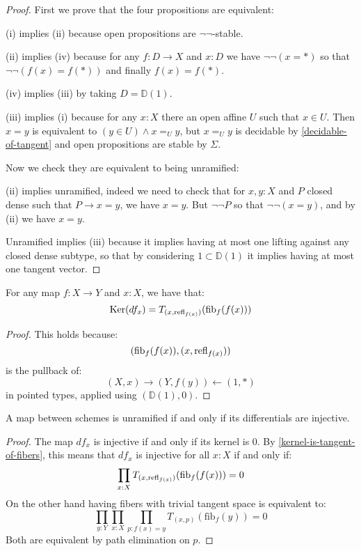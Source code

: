 \begin{proof}
First we prove that the four propositions are equivalent:

(i) implies (ii) because open propositions are $\neg\neg$-stable.

(ii) implies (iv) because for any $f:D\to X$ and $x:D$ we have $\neg\neg(x=*)$ so that $\neg\neg(f(x)=f(*))$ and finally $f(x)=f(*)$.

(iv) implies (iii) by taking $D=\mathbb{D}(1)$.

(iii) implies (i) because for any $x:X$ there an open affine $U$ such that $x\in U$. Then $x=y$ is equivalent to $(y\in U)\land x=_U y$, but $x=_Uy$ is decidable by \cref{decidable-of-tangent} and open propositions are stable by $\Sigma$.

Now we check they are equivalent to being unramified:

(ii) implies unramified, indeed we need to check that for $x,y:X$ and $P$ closed dense such that $P\to x=y$, we have $x=y$. But $\neg\neg P$ so that $\neg\neg(x=y)$, and by (ii) we have $x=y$.

Unramified implies (iii) because it implies having at most one lifting against any closed dense subtype, so that by considering $1\subset \mathbb{D}(1)$ it implies having at most one tangent vector.
\end{proof}

\begin{lemma}
\label{kernel-is-tangent-of-fibers}
For any map $f:X\to Y$ and $x:X$, we have that:
\[
\mathrm{Ker}(df_x) = T_{(x,\mathrm{refl}_{f(x)})}(\mathrm{fib}_f(f(x)))
\]
\end{lemma}
\begin{proof}
This holds because:
\[
(\mathrm{fib}_f(f(x)),(x,\mathrm{refl}_{f(x)}))
\]
is the pullback of:
\[
(X,x) \to (Y,f(y)) \leftarrow (1,*)
\]
in pointed types, applied using $(\mathbb{D}(1),0)$.
\end{proof}

\begin{proposition}
A map between schemes is unramified if and only if its differentials are injective. 
\end{proposition}
\begin{proof}
The map $df_x$ is injective if and only if its kernel is $0$. By \cref{kernel-is-tangent-of-fibers}, this means that $df_x$ is injective for all $x:X$ if and only if:
\[
\prod_{x:X}T_{(x,\mathrm{refl}_{f(x)})}(\mathrm{fib}_f(f(x)))=0
\]
On the other hand having fibers with trivial tangent space is equivalent to:
\[
\prod_{y:Y}\prod_{x:X}\prod_{p:f(x)=y} T_{(x,p)}(\mathrm{fib}_f(y)) = 0
\]
Both are equivalent by path elimination on $p$.
\end{proof}


